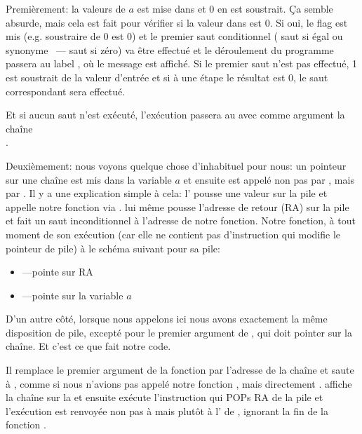 
Premièrement: la valeurs de $a$ est mise dans \EAX et 0 en est soustrait. Ça semble
absurde, mais cela est fait pour vérifier si la valeur dans \EAX est 0. Si oui, le
flag \ZF est mis (e.g. soustraire de 0 est 0) et le premier saut conditionnel \JE
( saut si égal ou synonyme \JZ~--- saut si zéro)
va être effectué et le déroulement du programme passera au label , où
le message  est affiché.
Si le premier saut n'est pas effectué, 1 est soustrait de la valeur d'entrée et si
à une étape le résultat est 0, le saut correspondant sera effectué.

Et si aucun saut n'est exécuté, l'exécution passera au \printf avec comme argument
la chaîne\\ .

\label{jump_to_last_printf}
\myindex{\Stack}

Deuxièmement: nous voyons quelque chose d'inhabituel pour nous: un pointeur sur une
chaîne est mis dans la variable $a$ et ensuite \printf est appelé non pas par \CALL,
mais par \JMP. Il y a une explication simple à cela: l'
pousse une valeur sur la pile et appelle notre fonction via \CALL.
\CALL lui même pousse l'adresse de retour (\ac{RA}) sur la pile et fait un saut
inconditionnel à l'adresse de notre fonction.
Notre fonction, à tout moment de son exécution (car elle ne contient pas d'instruction
qui modifie le pointeur de pile) à le schéma suivant pour sa pile:

\begin{itemize}
\item\ESP---pointe sur \ac{RA}
\item{}---pointe sur la variable $a$
\end{itemize}

D'un autre côté, lorsque nous appelons \printf ici nous avons exactement la même
disposition de pile, excepté pour le premier argument de \printf, qui doit pointer
sur la chaîne. Et c'est ce que fait notre code.

Il remplace le premier argument de la fonction par l'adresse de la chaîne et saute
à \printf, comme si nous n'avions pas appelé notre fonction \ttf, mais directement
\printf.
\printf affiche la chaîne sur la  et ensuite exécute
l'instruction \RET qui POPs \ac{RA} de la pile et l'exécution est renvoyée non pas
à \ttf mais plutôt à l' de \ttf, ignorant la fin de la
fonction \ttf.

